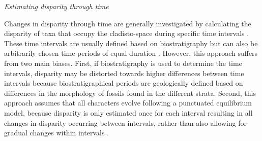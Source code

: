 \documentclass[12pt,letterpaper]{article}
\renewcommand{\subsection}[1]{%
\bigskip
\begin{center}
\begin{large}
\normalfont\itshape #1
\end{large}
\end{center}}
\begin{document}
\subsection{Estimating disparity through time} 
Changes in disparity through time are generally investigated by calculating the disparity of taxa that occupy the cladisto-space during specific time intervals \citep[e.g][]{cisneros2010,prentice2011,Hughes20082013,hopkinsdecoupling2013,bentonmodels2014,bensonfaunal2014}.
These time intervals are usually defined based on biostratigraphy \citep[e.g.][]{cisneros2010,prentice2011,Hughes20082013,bentonmodels2014} but can also be arbitrarily chosen time periods of equal duration \citep{Butler2012,hopkinsdecoupling2013,bensonfaunal2014}.
However, this approach suffers from two main biases. 
First, if biostratigraphy is used to determine the time intervals, disparity may be distorted towards higher differences between time intervals because biostratigraphical periods are geologically defined based on differences in the morphology of fossils found in the different strata.
Second, this approach assumes that all characters evolve following a punctuated equilibrium model, because disparity is only estimated once for each interval resulting in all changes in disparity occurring between intervals, rather than also allowing for gradual changes within intervals \citep{Hunt21042015}.
\end{document}
